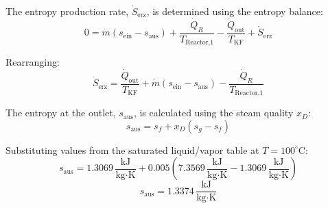 The entropy production rate, \( \dot{S}_{\text{erz}} \), is determined using the entropy balance:  
\[
0 = \dot{m} \left( s_{\text{ein}} - s_{\text{aus}} \right) + \frac{\dot{Q}_R}{T_{\text{Reactor,1}}} - \frac{\dot{Q}_{\text{out}}}{T_{\text{KF}}} + \dot{S}_{\text{erz}}
\]  

Rearranging:  
\[
\dot{S}_{\text{erz}} = \frac{\dot{Q}_{\text{out}}}{T_{\text{KF}}} + \dot{m} \left( s_{\text{ein}} - s_{\text{aus}} \right) - \frac{\dot{Q}_R}{T_{\text{Reactor,1}}}
\]  

The entropy at the outlet, \( s_{\text{aus}} \), is calculated using the steam quality \( x_D \):  
\[
s_{\text{aus}} = s_f + x_D \left( s_g - s_f \right)
\]  

Substituting values from the saturated liquid/vapor table at \( T = 100^\circ\text{C} \):  
\[
s_{\text{aus}} = 1.3069 \, \frac{\text{kJ}}{\text{kg·K}} + 0.005 \left( 7.3569 \, \frac{\text{kJ}}{\text{kg·K}} - 1.3069 \, \frac{\text{kJ}}{\text{kg·K}} \right)
\]  
\[
s_{\text{aus}} = 1.3374 \, \frac{\text{kJ}}{\text{kg·K}}
\]